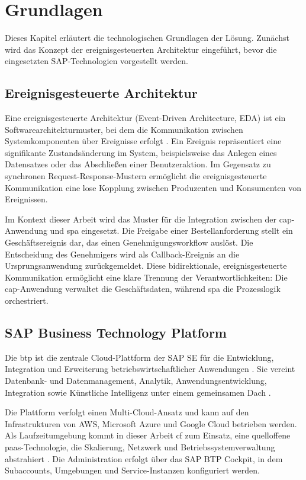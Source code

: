 \section{Grundlagen}
\label{sec:grundlagen}

Dieses Kapitel erläutert die technologischen Grundlagen der Lösung. Zunächst wird das Konzept der ereignisgesteuerten Architektur eingeführt, bevor die eingesetzten SAP-Technologien vorgestellt werden.

\subsection{Ereignisgesteuerte Architektur}
\label{subsec:eda}

Eine ereignisgesteuerte Architektur (Event-Driven Architecture, EDA) ist ein Softwarearchitekturmuster, bei dem die Kommunikation zwischen Systemkomponenten über Ereignisse erfolgt \citep{newman2021microservices}. Ein Ereignis repräsentiert eine signifikante Zustandsänderung im System, beispielsweise das Anlegen eines Datensatzes oder das Abschließen einer Benutzeraktion. Im Gegensatz zu synchronen Request-Response-Mustern ermöglicht die ereignisgesteuerte Kommunikation eine lose Kopplung zwischen Produzenten und Konsumenten von Ereignissen.

Im Kontext dieser Arbeit wird das Muster für die Integration zwischen der \gls{cap}-Anwendung und \gls{spa} eingesetzt. Die Freigabe einer Bestellanforderung stellt ein Geschäftsereignis dar, das einen Genehmigungsworkflow auslöst. Die Entscheidung des Genehmigers wird als Callback-Ereignis an die Ursprungsanwendung zurückgemeldet. Diese bidirektionale, ereignisgesteuerte Kommunikation ermöglicht eine klare Trennung der Verantwortlichkeiten: Die \gls{cap}-Anwendung verwaltet die Geschäftsdaten, während \gls{spa} die Prozesslogik orchestriert.

\subsection{SAP Business Technology Platform}
\label{subsec:btp}

Die \gls{btp} ist die zentrale Cloud-Plattform der SAP SE für die Entwicklung, Integration und Erweiterung betriebswirtschaftlicher Anwendungen \citep{sap2024btpguide}. Sie vereint Datenbank- und Datenmanagement, Analytik, Anwendungsentwicklung, Integration sowie Künstliche Intelligenz unter einem gemeinsamen Dach \citep{sap2024btp}.

Die Plattform verfolgt einen Multi-Cloud-Ansatz und kann auf den Infrastrukturen von AWS, Microsoft Azure und Google Cloud betrieben werden. Als Laufzeitumgebung kommt in dieser Arbeit \gls{cf} zum Einsatz, eine quelloffene \gls{paas}-Technologie, die Skalierung, Netzwerk und Betriebssystemverwaltung abstrahiert \citep{leymann2011cloud}. Die Administration erfolgt über das SAP BTP Cockpit, in dem Subaccounts, Umgebungen und Service-Instanzen konfiguriert werden.

